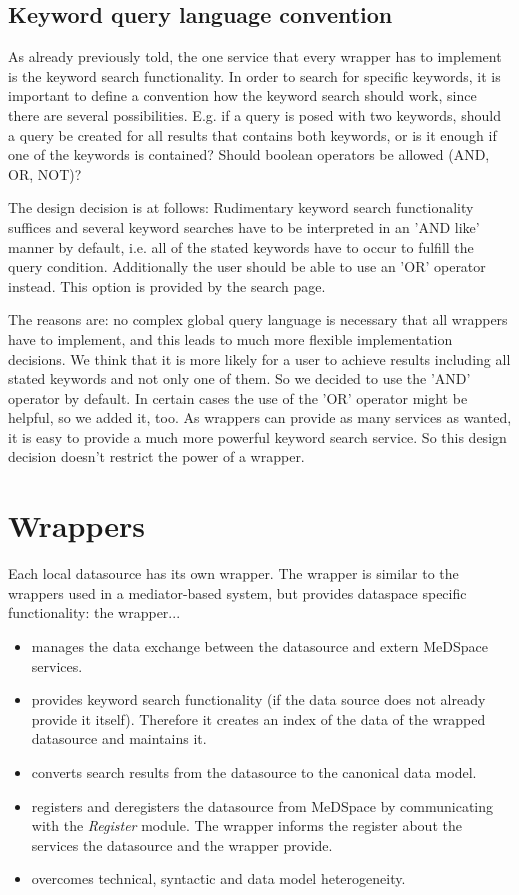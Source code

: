 \subsection{Keyword query language convention}
As already previously told, the one service that every wrapper has to implement is the keyword search functionality. In order to search for specific keywords, it is important to define a convention how the keyword search should work, since there are several possibilities. E.g. if a query is posed with two keywords, should a query be created for all results that contains both keywords, or is it enough if one of the keywords is contained? Should boolean operators be allowed (AND, OR, NOT)? 

The design decision is at follows: Rudimentary keyword search functionality suffices and several keyword searches have to be interpreted in an 'AND like' manner by default, i.e. all of the stated keywords have to occur to fulfill the query condition. Additionally the user should be able to use an 'OR' operator instead. This option is provided by the search page.

The reasons are: no complex global query language is necessary that all wrappers have to implement, and this leads to much more flexible implementation decisions. 
We think that it is more likely for a user to achieve results including all stated keywords and not only one of them. So we decided to use the 'AND' operator by default. 
In certain cases the use of the 'OR' operator might be helpful, so we added it, too.
As wrappers can provide as many services as wanted, it is easy to provide a much more powerful keyword search service. So this design decision doesn't restrict the power of a wrapper.


\section{Wrappers}
Each local datasource has its own wrapper. The wrapper is similar to the wrappers used in a mediator-based system, but provides dataspace specific functionality: the wrapper...
\begin{itemize}
	\item manages the data exchange between the datasource and extern MeDSpace services.
	\item provides keyword search functionality (if the data source does not already provide it itself). Therefore it creates an index of the data of the wrapped datasource and maintains it. 	
	\item converts search results from the datasource to the canonical data model.
	\item registers and deregisters the datasource from MeDSpace by communicating with the \emph{Register} module. The wrapper informs the register about the services the datasource and the wrapper provide.
	\item overcomes technical, syntactic and data model heterogeneity. 
\end{itemize}

